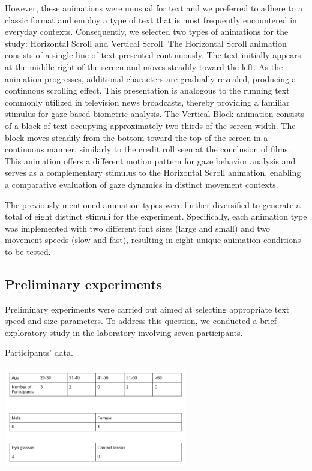 \documentclass[12pt]{report}
\begin{document}
However, these animations were unusual for text and we preferred to adhere to a classic format and employ a type of text that is most frequently encountered in everyday contexts. 
Consequently, we selected two types of animations for the study: Horizontal Scroll and Vertical Scroll.
The Horizontal Scroll animation consists of a single line of text presented continuously. 
The text initially appears at the middle right of the screen and moves steadily toward the left. 
As the animation progresses, additional characters are gradually revealed, producing a continuous scrolling effect. 
This presentation is analogous to the running text commonly utilized in television news broadcasts, thereby providing a familiar stimulus for gaze-based biometric analysis.
The Vertical Block animation consists of a block of text occupying approximately two-thirds of the screen width. 
The block moves steadily from the bottom toward the top of the screen in a continuous manner, similarly to the credit roll seen at the conclusion of films. 
This animation offers a different motion pattern for gaze behavior analysis and serves as a complementary stimulus to the Horizontal Scroll animation, enabling a comparative evaluation of gaze dynamics in distinct movement contexts.

The previously mentioned animation types were further diversified to generate a total of eight distinct stimuli for the experiment. 
Specifically, each animation type was implemented with two different font sizes (large and small) and two movement speeds (slow and fast), resulting in eight unique animation conditions to be tested.

\subsection{Preliminary experiments}

Preliminary experiments were carried out aimed at selecting appropriate text speed and size parameters. 
To address this question, we conducted a brief exploratory study in the laboratory involving seven participants.

\begin{table}[ht]
    \centering
    \caption{Participants' data.} %
    \includegraphics[width=0.6\textwidth]{Images/Experiment/tester_speeds.png}
    \label{tab:prel}
\end{table}
\end{document}
